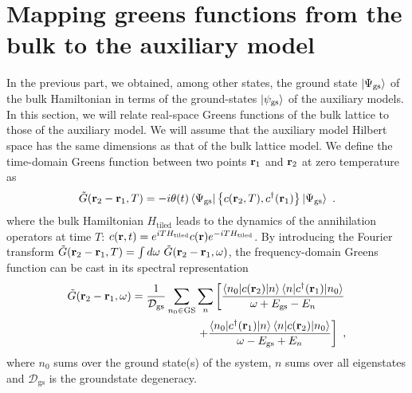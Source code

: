 \documentclass[reprint,hidelinks]{revtex4-2}
\begin{document}
\section{Mapping greens functions from the bulk to the auxiliary model}
In the previous part, we obtained, among other states, the ground state \(\ket{\Psi_\text{gs}}\) of the bulk Hamiltonian in terms of the ground-states \(\ket{\psi_\text{gs}}\) of the auxiliary models.
In this section, we will relate real-space Greens functions of the bulk lattice to those of the auxiliary model. We will assume that the auxiliary model Hilbert space has the same dimensions as that of the bulk lattice model.
We define the time-domain Greens function between two points \({\bf r}_1\) and \({\bf r}_2 \) at zero temperature as
\begin{equation}\begin{aligned}
	\tilde G({\bf r}_2 - {\bf r}_1, T) = -i\theta(t) \braket{\Psi_\text{gs} | \left\{ c({\bf r}_2, T), c^\dagger({\bf r}_1) \right\} | \Psi_\text{gs}}~.
\end{aligned}\end{equation}
where the bulk Hamiltonian \(H_\text{tiled}\) leads to the dynamics of the annihilation operators at time \(T\): \(c({\bf r},t) = e^{iT H_\text{tiled} }c({\bf r})e^{-i T H_\text{tiled}}\). By introducing the Fourier transform \(\tilde G({\bf r}_2 - {\bf r}_1, T) = \int d\omega~\tilde G({\bf r}_2 - {\bf r}_1, \omega)\), the frequency-domain Greens function can be cast in its spectral representation
\begin{equation}\begin{aligned}
	\tilde G({\bf r}_2 - {\bf r}_1, \omega) = \frac{1}{\mathcal{D}_\text{gs}}\sum_{n_0 \in \text{GS}}\sum_n \left[\frac{\braket{n_0|c({\bf r}_2)|n}\braket{n|c^\dagger({\bf r}_1)|n_0}}{\omega + E_\text{gs} - E_n} \right.\\
\left.+ \frac{\braket{n_0|c^\dagger({\bf r}_1)|n}\braket{n|c({\bf r}_2)|n_0}}{\omega - E_\text{gs} + E_n}\right] ~,
\end{aligned}\end{equation}
where \(n_0\) sums over the ground state(s) of the system, \(n\) sums over all eigenstates and \(\mathcal{D}_\text{gs}\) is the groundstate degeneracy.


\clearpage
\end{document}
